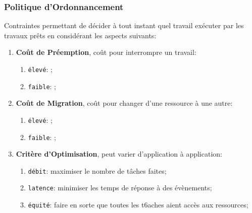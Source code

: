 \documentclass{article}
\begin{document}
\subsubsection{Politique d'Ordonnancement}
\begin{definition}\label{def:politiqueOrdonnancement}
    Contraintes permettant de décider à tout instant quel travail exécuter par les travaux prêts en considérant les aspects suivants:
    \begin{enumerate}
        \item \textbf{Coût de Préemption}, coût pour interrompre un travail:
        \begin{enumerate}[noitemsep]
            \item \texttt{élevé}: ;
            \item \texttt{faible}: ;
        \end{enumerate}
        \item \textbf{Coût de Migration}, coût pour changer d'une ressource à une autre:
        \begin{enumerate}[noitemsep]
            \item \texttt{élevé}: ;
            \item \texttt{faible}: ;
        \end{enumerate}
        \item \textbf{Critère d'Optimisation}, peut varier d'application à application:
        \begin{enumerate}[noitemsep]
            \item \texttt{débit}: maximiser le nombre de tâches faites;
            \item \texttt{latence}: minimiser les temps de réponse à des évènements;
            \item \texttt{équité}: faire en sorte que toutes les t6aches aient accès aux ressources;
        \end{enumerate}
    \end{enumerate}
\end{definition}
\end{document}

